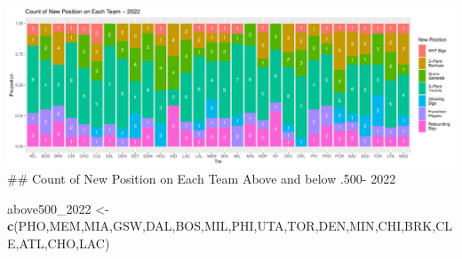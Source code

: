 \documentclass[
]{article}
\newenvironment{Shaded}{\begin{snugshade}}{\end{snugshade}}
\newcommand{\FunctionTok}[1]{\textcolor[rgb]{0.13,0.29,0.53}{\textbf{#1}}}
\newcommand{\NormalTok}[1]{#1}
\newcommand{\OtherTok}[1]{\textcolor[rgb]{0.56,0.35,0.01}{#1}}
\newcommand{\StringTok}[1]{\textcolor[rgb]{0.31,0.60,0.02}{#1}}
\begin{document}
\includegraphics{Reclassifying-NBA-Player-Postions-Pt.-3---Clustering-Analysis-Results_files/figure-latex/unnamed-chunk-14-1.pdf}
\#\# Count of New Position on Each Team Above and below .500- 2022

\begin{Shaded}
\begin{Highlighting}[]
\NormalTok{above500\_2022 }\OtherTok{\textless{}{-}} \FunctionTok{c}\NormalTok{(}\StringTok{\textquotesingle{}PHO\textquotesingle{}}\NormalTok{,}\StringTok{\textquotesingle{}MEM\textquotesingle{}}\NormalTok{,}\StringTok{\textquotesingle{}MIA\textquotesingle{}}\NormalTok{,}\StringTok{\textquotesingle{}GSW\textquotesingle{}}\NormalTok{,}\StringTok{\textquotesingle{}DAL\textquotesingle{}}\NormalTok{,}\StringTok{\textquotesingle{}BOS\textquotesingle{}}\NormalTok{,}\StringTok{\textquotesingle{}MIL\textquotesingle{}}\NormalTok{,}\StringTok{\textquotesingle{}PHI\textquotesingle{}}\NormalTok{,}\StringTok{\textquotesingle{}UTA\textquotesingle{}}\NormalTok{,}\StringTok{\textquotesingle{}TOR\textquotesingle{}}\NormalTok{,}\StringTok{\textquotesingle{}DEN\textquotesingle{}}\NormalTok{,}\StringTok{\textquotesingle{}MIN\textquotesingle{}}\NormalTok{,}\StringTok{\textquotesingle{}CHI\textquotesingle{}}\NormalTok{,}\StringTok{\textquotesingle{}BRK\textquotesingle{}}\NormalTok{,}\StringTok{\textquotesingle{}CLE\textquotesingle{}}\NormalTok{,}\StringTok{\textquotesingle{}ATL\textquotesingle{}}\NormalTok{,}\StringTok{\textquotesingle{}CHO\textquotesingle{}}\NormalTok{,}\StringTok{\textquotesingle{}LAC\textquotesingle{}}\NormalTok{)}


\end{Highlighting}
\end{Shaded}
\end{document}
